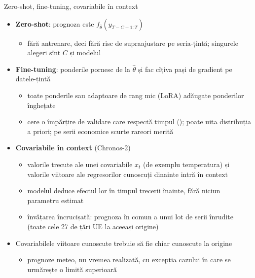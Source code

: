 \begin{frame}{Zero-shot, fine-tuning, covariabile în context}
\itemsize{\small}
\begin{itemize}
    \item \textbf{Zero-shot}: prognoza este $f_{\hat\theta}(y_{T-C+1:T})$
    \begin{itemize}
        \item fără antrenare, deci fără risc de supraajustare pe seria-țintă; singurele alegeri sînt $C$ și modelul
    \end{itemize}
    \item \textbf{Fine-tuning}: ponderile pornesc de la $\hat\theta$ și fac cîțiva pași de gradient pe datele-țintă
    \begin{itemize}
        \item toate ponderile sau adaptoare de rang mic (LoRA) adăugate ponderilor înghețate
        \item cere o împărțire de validare care respectă timpul (); poate uita distribuția a priori; pe serii economice scurte rareori merită
    \end{itemize}
    \item \textbf{Covariabile în context} (Chronos-2)
    \begin{itemize}
        \item valorile trecute ale unei covariabile $x_t$ (de exemplu temperatura) și valorile viitoare ale regresorilor cunoscuți dinainte intră în context
        \item modelul deduce efectul lor în timpul trecerii înainte, fără niciun parametru estimat
        \item învățarea încrucișată: prognoza în comun a unui lot de serii înrudite (toate cele 27 de țări UE la aceeași origine)
    \end{itemize}
    \item Covariabilele viitoare cunoscute trebuie să fie chiar cunoscute la origine
    \begin{itemize}
        \item prognoze meteo, nu vremea realizată, cu excepția cazului în care se urmărește o limită superioară
    \end{itemize}
\end{itemize}
\end{frame}

